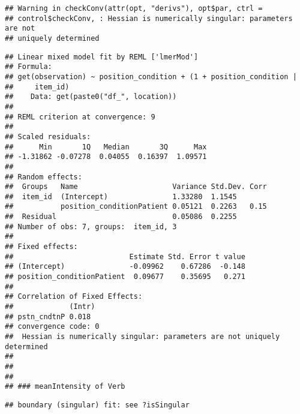 \documentclass[]{article}
\begin{document}
\begin{verbatim}
## Warning in checkConv(attr(opt, "derivs"), opt$par, ctrl =
## control$checkConv, : Hessian is numerically singular: parameters are not
## uniquely determined
\end{verbatim}

\begin{verbatim}
## Linear mixed model fit by REML ['lmerMod']
## Formula: 
## get(observation) ~ position_condition + (1 + position_condition |  
##     item_id)
##    Data: get(paste0("df_", location))
## 
## REML criterion at convergence: 9
## 
## Scaled residuals: 
##      Min       1Q   Median       3Q      Max 
## -1.31862 -0.07278  0.04055  0.16397  1.09571 
## 
## Random effects:
##  Groups   Name                      Variance Std.Dev. Corr
##  item_id  (Intercept)               1.33280  1.1545       
##           position_conditionPatient 0.05121  0.2263   0.15
##  Residual                           0.05086  0.2255       
## Number of obs: 7, groups:  item_id, 3
## 
## Fixed effects:
##                           Estimate Std. Error t value
## (Intercept)               -0.09962    0.67286  -0.148
## position_conditionPatient  0.09677    0.35695   0.271
## 
## Correlation of Fixed Effects:
##             (Intr)
## pstn_cndtnP 0.018 
## convergence code: 0
##  Hessian is numerically singular: parameters are not uniquely determined
## 
##   
##   
## ### meanIntensity of Verb
\end{verbatim}

\begin{verbatim}
## boundary (singular) fit: see ?isSingular
\end{verbatim}
\end{document}
